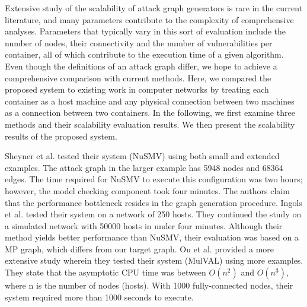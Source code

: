 Extensive study of the scalability of attack graph generators is rare in the current literature, and many parameters contribute to the complexity of comprehensive analyses. Parameters that typically vary in this sort of evaluation include the number of nodes, their connectivity and the number of vulnerabilities per container, all of which contribute to the execution time of a given algorithm. Even though the definitions of an attack graph differ, we hope to achieve a comprehensive comparison with current methods. Here, we compared the proposed system to existing work in computer networks by treating each container as a host machine and any physical connection between two machines as a connection between two containers. In the following, we first examine three methods and their scalability evaluation results. We then present the scalability results of the proposed system.

Sheyner et al. \cite{sheyner2002automated} tested their system (NuSMV) using both small and extended examples. The attack graph in the larger example has 5948 nodes and 68364 edges. The time required for NuSMV to execute this configuration was two hours; however, the model checking component took four minutes. The authors claim that the performance bottleneck resides in the graph generation procedure. Ingols et al. \cite{ingols2006practical} tested their system on a network of 250 hosts. They continued the study on a simulated network with 50000 hosts in under four minutes. Although their method yields better performance than NuSMV, their evaluation was based on a MP graph, which differs from our target graph. Ou et al. \cite{ou2006scalable} provided a more extensive study wherein they tested their system (MulVAL) using more examples. They state that the asymptotic CPU time was between $O(n^2)$ and $O(n^3)$, where n is the number of nodes (hosts). With 1000 fully-connected nodes, their system required more than 1000 seconds to execute. %


